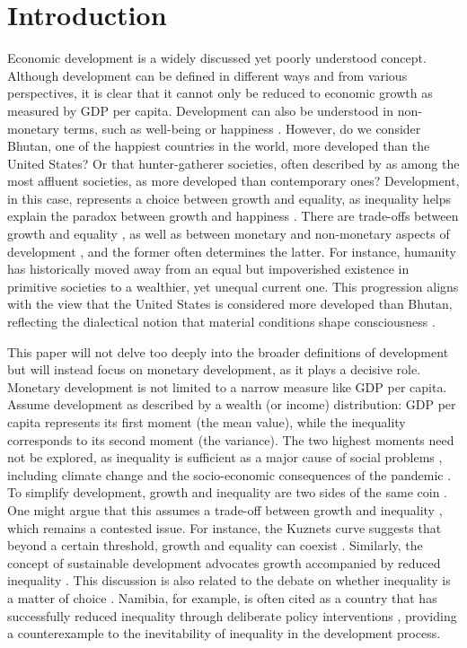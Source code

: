 \section{Introduction}

Economic development is a widely discussed yet poorly understood concept. Although development can be defined in different ways and from various perspectives, it is clear that it cannot only be reduced to economic growth as measured by GDP per capita. Development can also be understood in non-monetary terms, such as well-being or happiness \citep{agrawal2024economic}. However, do we consider Bhutan, one of the happiest countries in the world, more developed than the United States? Or that hunter-gatherer societies, often described by \textcite{sahlins2013original} as among the most affluent societies, as more developed than contemporary ones? Development, in this case, represents a choice between growth and equality, as inequality helps explain the paradox between growth and happiness \parencite{oishi2015income}. There are trade-offs between growth and equality \parencite{okun2010equality}, as well as between monetary and non-monetary aspects of development \parencite{kahneman2010high}, and the former often determines the latter. For instance, humanity has historically moved away from an equal but impoverished existence in primitive societies to a wealthier, yet unequal current one. This progression aligns with the view that the United States is considered more developed than Bhutan, reflecting the dialectical notion that material conditions shape consciousness \parencite{lefebvre2009dialectical}. 

This paper will not delve too deeply into the broader definitions of development but will instead focus on monetary development, as it plays a decisive role. Monetary development is not limited to a narrow measure like GDP per capita. Assume development as described by a wealth (or income) distribution: GDP per capita represents its first moment (the mean value), while the inequality corresponds to its second moment (the variance). The two highest moments need not be explored, as inequality is sufficient as a major cause of social problems \parencite{neckerman2007inequality}, including climate change \parencite{duong2023does} and the socio-economic consequences of the pandemic \parencite{stantcheva2022inequalities}. To simplify development, growth and inequality are two sides of the same coin \parencite{berg2017inequality}. One might argue that this assumes a trade-off between growth and inequality \parencite{okun2010equality}, which remains a contested issue. For instance, the Kuznets curve suggests that beyond a certain threshold, growth and equality can coexist \parencite{nielsen1997kuznets}. Similarly, the concept of sustainable development advocates growth accompanied by reduced inequality \parencite{freistein2016potential}. This discussion is also related to the debate on whether inequality is a matter of choice \parencite{stiglitz2013inequality}. Namibia, for example, is often cited as a country that has successfully reduced inequality through deliberate policy interventions \parencite{lawson2017inequality}, providing a counterexample to the inevitability of inequality in the development process.

